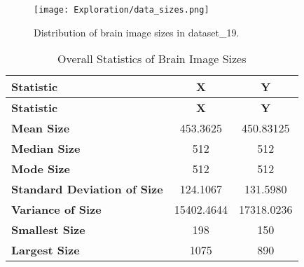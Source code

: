 \begin{figure}[H]
  \begin{center}
    \texttt{[image: Exploration/data\_sizes.png]}
  \end{center}
  \caption{Distribution of brain image sizes in dataset\_19.}\label{fig:data_sizes}
\end{figure}

\begin{longtable}{|l|c|c|}
\caption{Overall Statistics of Brain Image Sizes}\\
\hline
\textbf{Statistic} & \textbf{X} & \textbf{Y} \\
\hline
\endfirsthead
\hline
\textbf{Statistic} & \textbf{X} & \textbf{Y} \\
\hline
\endhead
\hline
\endfoot
\endlastfoot
\textbf{Mean Size} & 453.3625 & 450.83125 \\
\hline
\textbf{Median Size} & 512 & 512 \\
\hline
\textbf{Mode Size} & 512 & 512 \\
\hline
\textbf{Standard Deviation of Size} & 124.1067 & 131.5980 \\
\hline
\textbf{Variance of Size} & 15402.4644 & 17318.0236 \\
\hline
\textbf{Smallest Size} & 198 & 150 \\
\hline
\textbf{Largest Size} & 1075 & 890 \\
\hline
\end{longtable}

\vspace{1cm}

